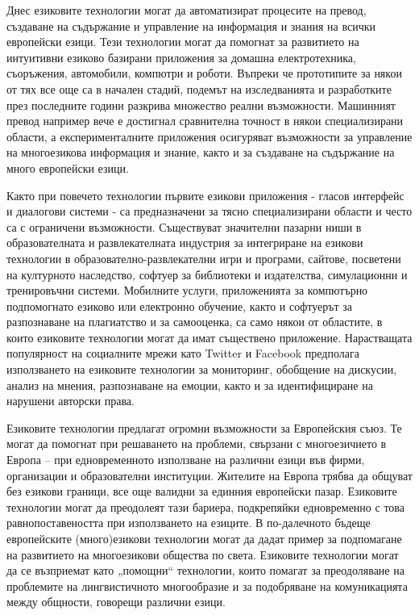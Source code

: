 \documentclass[]{../../metanetpaper}
\begin{document}
\begin{multicols}{2}
Днес езиковите технологии могат да автоматизират процесите на превод, създаване на съдържание и управление на информация и знания на всички европейски езици. Тези технологии могат да помогнат за развитието на интуитивни
 езиково базирани приложения за домашна електротехника, съоръжения, автомобили, компютри и роботи. Въпреки че прототипите
 за някои от тях все още са в начален стадий, подемът на изследванията и разработките през последните години разкрива множество реални възможности. Машинният превод например вече е достигнал сравнителна точност в някои специализирани области, а
 експерименталните приложения осигуряват възможности за управление на
 многоезикова информация и знание, както и за
 създаване на съдържание на много европейски езици.

Както при повечето технологии първите езикови приложения - гласов
 интерфейс и диалогови системи - са предназначени за тясно специализирани области и често са с ограничени възможности. 
 Съществуват значителни пазарни ниши в образователната и развлекателната индустрия за интегриране на  езикови технологии в образователно-развлекателни  игри и програми, сайтове, посветени на културното наследство, софтуер за библиотеки и издателства, симулационни и тренировъчни системи. 
Мобилните услуги, приложенията за компютърно подпомогнато езиково или електронно обучение, както и софтуерът за разпознаване
 на плагиатство и за самооценка, са само някои от областите, в които езиковите технологии могат да имат съществено приложение. Нарастващата популярност на социалните мрежи като Twitter и Facebook предполага използването на езиковите технологии за мониторинг, обобщение на дискусии, анализ на мнения, разпознаване на емоции, както и за идентифициране на нарушени авторски права.

Езиковите технологии предлагат огромни възможности за Европейския
 съюз. Те могат да помогнат при решаването на проблеми, свързани с многоезичието в Европа – при едновременното използване на различни езици във фирми, организации и образователни институции. Жителите на Европа трябва  да общуват без езикови граници, все още валидни за единния европейски пазар.  Езиковите технологии могат да преодолеят тази бариера, подкрепяйки едновременно с това равнопоставеността при използването на езиците. 
В по-далечното бъдеще европейските (много)езикови технологии могат да дадат пример за подпомагане на развитието на многоезикови общества по света.
 Езиковите технологии могат да се възприемат като „помощни“ технологии, които помагат за преодоляване на проблемите на лингвистичното многообразие и за подобряване на комуникацията между общности, говорещи различни езици.


\end{multicols}
\end{document}
